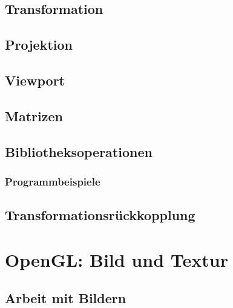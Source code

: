\documentclass{scrreprt}
\begin{document}
\section{Transformation}

\section{Projektion}

\section{Viewport}

\section{Matrizen}
\section{Bibliotheksoperationen}

\subsection{Programmbeispiele}

\section{Transformationsrückkopplung}

\chapter{OpenGL: Bild und Textur}

\section{Arbeit mit Bildern}
\end{document}

